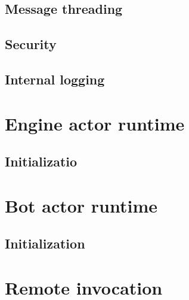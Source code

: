 \documentclass[11pt,a4paper,oneside]{report}
\begin{document}
		\subsection{Message threading}

		\subsection{Security}
		
		\subsection{Internal logging}
		
	\section{Engine actor runtime}

		\subsection{Initializatio}

	\section{Bot actor runtime}
	
		\subsection{Initialization}

	\section{Remote invocation}
\end{document}
